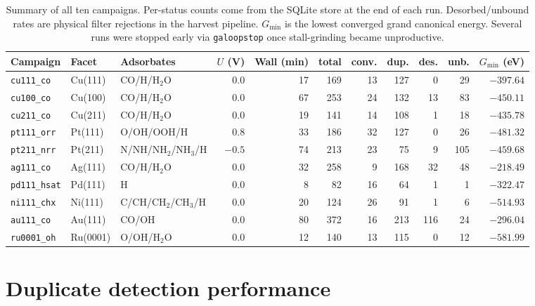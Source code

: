 \documentclass[11pt,a4paper]{article}
\begin{document}
\begin{table}[H]
\centering
\small
\begin{tabular}{lllrrrrrrrr}
\toprule
Campaign & Facet & Adsorbates & $U$ (V) & Wall (min) & total & conv. & dup. & des. & unb. & $G_{\min}$ (eV) \\
\midrule
\texttt{cu111\_co}  & Cu(111)  & CO/H/H$_2$O      &  0.0 & 17 & 169 & 13 & 127 &   0 &  29 & $-397.64$ \\
\texttt{cu100\_co}  & Cu(100)  & CO/H/H$_2$O      &  0.0 & 67 & 253 & 24 & 132 &  13 &  83 & $-450.11$ \\
\texttt{cu211\_co}  & Cu(211)  & CO/H/H$_2$O      &  0.0 & 19 & 141 & 14 & 108 &   1 &  18 & $-435.78$ \\
\texttt{pt111\_orr} & Pt(111)  & O/OH/OOH/H       &  0.8 & 33 & 186 & 32 & 127 &   0 &  26 & $-481.32$ \\
\texttt{pt211\_nrr} & Pt(211)  & N/NH/NH$_2$/NH$_3$/H & $-0.5$ & 74 & 213 & 23 &  75 &   9 & 105 & $-459.68$ \\
\texttt{ag111\_co}  & Ag(111)  & CO/H/H$_2$O      &  0.0 & 32 & 258 &  9 & 168 &  32 &  48 & $-218.49$ \\
\texttt{pd111\_hsat}& Pd(111)  & H                &  0.0 &  8 &  82 & 16 &  64 &   1 &   1 & $-322.47$ \\
\texttt{ni111\_chx} & Ni(111)  & C/CH/CH$_2$/CH$_3$/H & 0.0 & 20 & 124 & 26 &  91 &   1 &   6 & $-514.93$ \\
\texttt{au111\_co}  & Au(111)  & CO/OH            &  0.0 & 80 & 372 & 16 & 213 & 116 &  24 & $-296.04$ \\
\texttt{ru0001\_oh} & Ru(0001) & O/OH/H$_2$O      &  0.0 & 12 & 140 & 13 & 115 &   0 &  12 & $-581.99$ \\
\bottomrule
\end{tabular}
\caption{Summary of all ten campaigns. Per-status counts come from
the SQLite store at the end of each run. Desorbed/unbound rates are
physical filter rejections in the harvest pipeline. $G_{\min}$ is the
lowest converged grand canonical energy. Several runs were stopped
early via \texttt{galoopstop} once stall-grinding became unproductive.}
\label{tab:summary}
\end{table}

\section{Duplicate detection performance}
\label{sec:dup}
\end{document}
